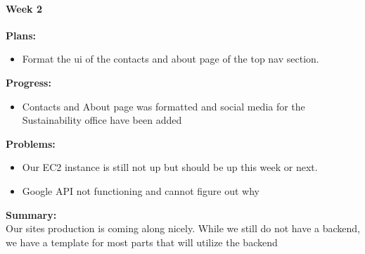 \paragraph{Week 2}
\begin{adjustwidth}{2.5em}{0pt}
    \vspace{-0.5cm}\textbf{Plans:}
    \vspace{-0.5cm}
    \begin{itemize}
        \item Format the ui of the contacts and about page of the top nav section. 
    \end{itemize} 
    \vspace{-0.3cm}\textbf{Progress:}
    \vspace{-0.5cm}
    \begin{itemize}
        \item Contacts and About page was formatted and social media for the Sustainability office have been added
    \end{itemize} 
    \vspace{-0.3cm}\textbf{Problems:}
    \vspace{-0.5cm}
    \begin{itemize}
        \item Our EC2 instance is still not up but should be up this week or next.
		\item Google API not functioning and cannot figure out why
    \end{itemize}  
    \vspace{-0.3cm}\noindent\textbf{Summary:}\\
    \noindent Our sites production is coming along nicely. While we still do not have a backend, we have a template for most parts that will utilize the backend
	\end{adjustwidth} 

